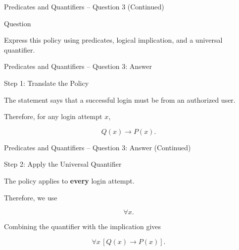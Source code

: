 \begin{frame}{Predicates and Quantifiers -- Question 3 (Continued)}

\begin{block}{Question}

Express this policy using predicates, logical implication, and a
universal quantifier.

\end{block}

\end{frame}


\begin{frame}{Predicates and Quantifiers -- Question 3: Answer}

\begin{exampleblock}{Step 1: Translate the Policy}

The statement says that a successful login must be from an authorized
user.

Therefore, for any login attempt $x$,

$$
Q(x)\rightarrow P(x).
$$

\end{exampleblock}

\end{frame}


\begin{frame}{Predicates and Quantifiers -- Question 3: Answer (Continued)}

\begin{exampleblock}{Step 2: Apply the Universal Quantifier}

The policy applies to \textbf{every} login attempt.

Therefore, we use

$$
\forall x.
$$

Combining the quantifier with the implication gives

$$
\boxed{\forall x\,[Q(x)\rightarrow P(x)]}.
$$

\end{exampleblock}

\end{frame}


